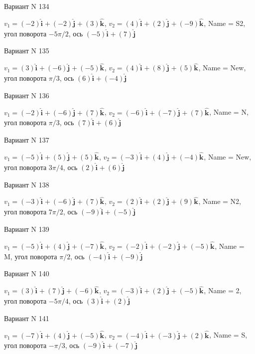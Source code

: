 \documentclass[11pt]{report}
\begin{document}
Вариант N 134

$v_1 = (-2)\mathbf{\hat{i}_{}} + (-2)\mathbf{\hat{j}_{}} + (3)\mathbf{\hat{k}_{}}$, $v_2 = (4)\mathbf{\hat{i}_{}} + (2)\mathbf{\hat{j}_{}} + (-9)\mathbf{\hat{k}_{}}$, Name = S2, угол поворота $- 5 \pi / 2$, ось $(-5)\mathbf{\hat{i}_{}} + (7)\mathbf{\hat{j}_{}}$

Вариант N 135

$v_1 = (3)\mathbf{\hat{i}_{}} + (-6)\mathbf{\hat{j}_{}} + (-5)\mathbf{\hat{k}_{}}$, $v_2 = (4)\mathbf{\hat{i}_{}} + (8)\mathbf{\hat{j}_{}} + (5)\mathbf{\hat{k}_{}}$, Name = New, угол поворота $\pi / 3$, ось $(6)\mathbf{\hat{i}_{}} + (-4)\mathbf{\hat{j}_{}}$

Вариант N 136

$v_1 = (-2)\mathbf{\hat{i}_{}} + (-6)\mathbf{\hat{j}_{}} + (7)\mathbf{\hat{k}_{}}$, $v_2 = (-6)\mathbf{\hat{i}_{}} + (-7)\mathbf{\hat{j}_{}} + (7)\mathbf{\hat{k}_{}}$, Name = N, угол поворота $\pi / 3$, ось $(7)\mathbf{\hat{i}_{}} + (6)\mathbf{\hat{j}_{}}$

Вариант N 137

$v_1 = (-5)\mathbf{\hat{i}_{}} + (5)\mathbf{\hat{j}_{}} + (5)\mathbf{\hat{k}_{}}$, $v_2 = (-3)\mathbf{\hat{i}_{}} + (4)\mathbf{\hat{j}_{}} + (-4)\mathbf{\hat{k}_{}}$, Name = New, угол поворота $3 \pi / 4$, ось $(2)\mathbf{\hat{i}_{}} + (6)\mathbf{\hat{j}_{}}$

Вариант N 138

$v_1 = (-3)\mathbf{\hat{i}_{}} + (-6)\mathbf{\hat{j}_{}} + (7)\mathbf{\hat{k}_{}}$, $v_2 = (2)\mathbf{\hat{i}_{}} + (2)\mathbf{\hat{j}_{}} + (9)\mathbf{\hat{k}_{}}$, Name = N2, угол поворота $7 \pi / 2$, ось $(-9)\mathbf{\hat{i}_{}} + (-5)\mathbf{\hat{j}_{}}$

Вариант N 139

$v_1 = (-5)\mathbf{\hat{i}_{}} + (4)\mathbf{\hat{j}_{}} + (-7)\mathbf{\hat{k}_{}}$, $v_2 = (-2)\mathbf{\hat{i}_{}} + (-2)\mathbf{\hat{j}_{}} + (-5)\mathbf{\hat{k}_{}}$, Name = M, угол поворота $\pi / 2$, ось $(-4)\mathbf{\hat{i}_{}} + (-9)\mathbf{\hat{j}_{}}$

Вариант N 140

$v_1 = (3)\mathbf{\hat{i}_{}} + (7)\mathbf{\hat{j}_{}} + (-6)\mathbf{\hat{k}_{}}$, $v_2 = (-3)\mathbf{\hat{i}_{}} + (2)\mathbf{\hat{j}_{}} + (-5)\mathbf{\hat{k}_{}}$, Name = 2, угол поворота $- 5 \pi / 4$, ось $(3)\mathbf{\hat{i}_{}} + (2)\mathbf{\hat{j}_{}}$

Вариант N 141

$v_1 = (-7)\mathbf{\hat{i}_{}} + (4)\mathbf{\hat{j}_{}} + (-5)\mathbf{\hat{k}_{}}$, $v_2 = (-4)\mathbf{\hat{i}_{}} + (-3)\mathbf{\hat{j}_{}} + (2)\mathbf{\hat{k}_{}}$, Name = S, угол поворота $- \pi / 3$, ось $(-9)\mathbf{\hat{i}_{}} + (-7)\mathbf{\hat{j}_{}}$
\end{document}
